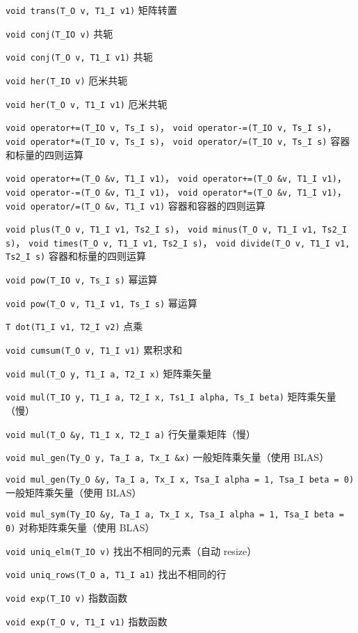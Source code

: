 \verb|void trans(T_O v, T1_I v1)| 矩阵转置

\verb|void conj(T_IO v)| 共轭

\verb|void conj(T_O v, T1_I v1)| 共轭

\verb|void her(T_IO v)| 厄米共轭

\verb|void her(T_O v, T1_I v1)| 厄米共轭

\verb|void operator+=(T_IO v, Ts_I s)|， \verb|void operator-=(T_IO v, Ts_I s)|， \verb|void operator*=(T_IO v, Ts_I s)|， \verb|void operator/=(T_IO v, Ts_I s)| 容器和标量的四则运算

\verb|void operator+=(T_O &v, T1_I v1)|， \verb|void operator+=(T_O &v, T1_I v1)|， \verb|void operator-=(T_O &v, T1_I v1)|， \verb|void operator*=(T_O &v, T1_I v1)|， \verb|void operator/=(T_O &v, T1_I v1)| 容器和容器的四则运算

\verb|void plus(T_O v, T1_I v1, Ts2_I s)|， \verb|void minus(T_O v, T1_I v1, Ts2_I s)|， \verb|void times(T_O v, T1_I v1, Ts2_I s)|， \verb|void divide(T_O v, T1_I v1, Ts2_I s)| 容器和标量的四则运算

\verb|void pow(T_IO v, Ts_I s)| 幂运算

\verb|void pow(T_O v, T1_I v1, Ts_I s)| 幂运算

\verb|T dot(T1_I v1, T2_I v2)| 点乘

\verb|void cumsum(T_O v, T1_I v1)| 累积求和

\verb|void mul(T_O y, T1_I a, T2_I x)| 矩阵乘矢量

\verb|void mul(T_IO y, T1_I a, T2_I x, Ts1_I alpha, Ts_I beta)| 矩阵乘矢量（慢）

\verb|void mul(T_O &y, T1_I x, T2_I a)| 行矢量乘矩阵（慢）

\verb|void mul_gen(Ty_O y, Ta_I a, Tx_I &x)| 一般矩阵乘矢量（使用 BLAS）

\verb|void mul_gen(Ty_O &y, Ta_I a, Tx_I x, Tsa_I alpha = 1, Tsa_I beta = 0)| 一般矩阵乘矢量（使用 BLAS）

\verb|void mul_sym(Ty_IO &y, Ta_I a, Tx_I x, Tsa_I alpha = 1, Tsa_I beta = 0)| 对称矩阵乘矢量（使用 BLAS）

\verb|void uniq_elm(T_IO v)| 找出不相同的元素（自动 resize）

\verb|void uniq_rows(T_O a, T1_I a1)| 找出不相同的行

\verb|void exp(T_IO v)| 指数函数

\verb|void exp(T_O v, T1_I v1)| 指数函数
